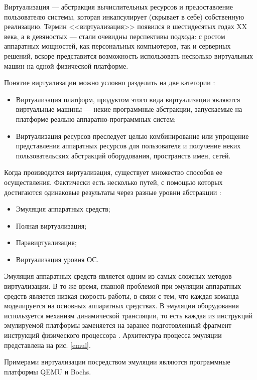 Виртуализация --- абстракция вычислительных ресурсов и предоставление пользователю системы, которая инкапсулирует (скрывает в себе) собственную реализацию.
Термин <<виртуализация>> появился в шестидесятых годах XX века, а в девяностых --- стали очевидны перспективы подхода: с ростом аппаратных мощностей, как персональных компьютеров, так и серверных решений, вскоре представится возможность использовать несколько виртуальных машин на одной физической платформе.

Понятие виртуализации можно условно разделить на две категории \cite{ibm-virt}:
\begin{itemize}
  \item Виртуализация платформ, продуктом этого вида виртуализации являются виртуальные машины --- некие программные абстракции, запускаемые на платформе реально аппаратно-программных систем;
  \item Виртуализация ресурсов преследует целью комбинирование или упрощение представления аппаратных ресурсов для пользователя и получение неких пользовательских абстракций оборудования, пространств имен, сетей.
\end{itemize}

Когда производится виртуализация, существует множество способов ее осуществления.
Фактически есть несколько путей, с помощью которых достигаются одинаковые результаты через разные уровни абстракции \cite{openvz-tutorial}:
\begin{itemize}
  \item Эмуляция аппаратных средств;
  \item Полная виртуализация;
  \item Паравиртуализация;
  \item Виртуализация уровня ОС.
\end{itemize}

Эмуляция аппаратных средств является одним из самых сложных методов виртуализации.
В то же время, главной проблемой при эмуляции аппаратных средств является низкая скорость работы, в связи с тем, что каждая команда моделируется на основных аппаратных средствах. 
В эмуляции оборудования используется механизм динамической трансляции, то есть каждая из инструкций эмулируемой платформы заменяется на заранее подготовленный фрагмент инструкций физического процессора \cite{qemu-ibm}.
Архитектура процесса эмуляции представлена на рис. \ref{emul}.

Примерами виртуализации посредством эмуляции являются программные платформы QEMU и Bochs.

